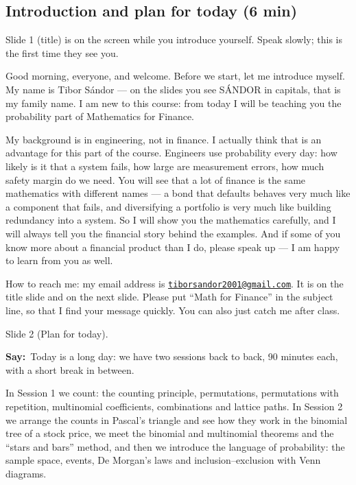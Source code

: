 \documentclass[11pt,a4paper,parskip=half]{scrartcl}
\makeatletter
\newcommand{\myemail}{tiborsandor2001@gmail.com}
\newcommand{\say}{\textbf{\color{teal}Say:}\ }
\newcommand{\slide}[1]{\marginpar{\raggedright\footnotesize\color{gray}slide #1}}
\makeatother
\begin{document}
\subsection{Introduction and plan for today (6 min)}\slide{1--3}

\begin{cue}
	Slide 1 (title) is on the screen while you introduce yourself. Speak
	slowly; this is the first time they see you.
\end{cue}

Good morning, everyone, and welcome. Before we start, let me introduce
myself. My name is Tibor Sándor --- on the slides you see SÁNDOR in capitals,
that is my family name. I am new to this course: from today I will be
teaching you the probability part of Mathematics for Finance.

My background is in engineering, not in finance. I actually think that is
an advantage for this part of the course. Engineers use probability every
day: how likely is it that a system fails, how large are measurement errors,
how much safety margin do we need. You will see that a lot of finance is
the same mathematics with different names --- a bond that defaults behaves
very much like a component that fails, and diversifying a portfolio is very
much like building redundancy into a system. So I will show you the
mathematics carefully, and I will always tell you the financial story behind
the examples. And if some of you know more about a financial product than I
do, please speak up --- I am happy to learn from you as well.

How to reach me: my email address is
\href{mailto:\myemail}{\texttt{\myemail}}. It is on the title slide and on
the next slide. Please put ``Math for Finance'' in the subject line, so that
I find your message quickly. You can also just catch me after class.

\begin{cue}
	Slide 2 (Plan for today).
\end{cue}

\say Today is a long day: we have two sessions back to back, 90 minutes
each, with a short break in between.

In Session 1 we count: the counting principle, permutations, permutations
with repetition, multinomial coefficients, combinations and lattice paths.
In Session 2 we arrange the counts in Pascal's triangle and see how they
work in the binomial tree of a stock price, we meet the binomial and
multinomial theorems and the ``stars and bars'' method, and then we
introduce the language of probability: the sample space, events, De
Morgan's laws and inclusion--exclusion with Venn diagrams.
\end{document}
